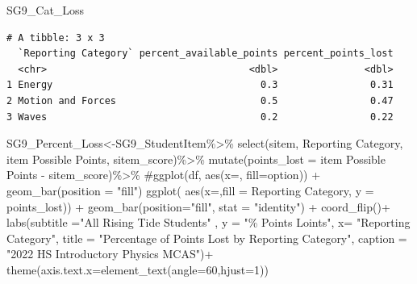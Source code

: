 \documentclass[
  letterpaper,
  DIV=11,
  numbers=noendperiod]{scrartcl}
\newenvironment{Shaded}{\begin{snugshade}}{\end{snugshade}}
\newcommand{\AttributeTok}[1]{\textcolor[rgb]{0.40,0.45,0.13}{#1}}
\newcommand{\CommentTok}[1]{\textcolor[rgb]{0.37,0.37,0.37}{#1}}
\newcommand{\DecValTok}[1]{\textcolor[rgb]{0.68,0.00,0.00}{#1}}
\newcommand{\FunctionTok}[1]{\textcolor[rgb]{0.28,0.35,0.67}{#1}}
\newcommand{\NormalTok}[1]{\textcolor[rgb]{0.00,0.23,0.31}{#1}}
\newcommand{\OtherTok}[1]{\textcolor[rgb]{0.00,0.23,0.31}{#1}}
\newcommand{\SpecialCharTok}[1]{\textcolor[rgb]{0.37,0.37,0.37}{#1}}
\newcommand{\StringTok}[1]{\textcolor[rgb]{0.13,0.47,0.30}{#1}}
\begin{document}
\begin{Shaded}
\begin{Highlighting}[]
\NormalTok{SG9\_Cat\_Loss}
\end{Highlighting}
\end{Shaded}

\begin{verbatim}
# A tibble: 3 x 3
  `Reporting Category` percent_available_points percent_points_lost
  <chr>                                   <dbl>               <dbl>
1 Energy                                    0.3                0.31
2 Motion and Forces                         0.5                0.47
3 Waves                                     0.2                0.22
\end{verbatim}

\begin{Shaded}
\begin{Highlighting}[]
\NormalTok{SG9\_Percent\_Loss}\OtherTok{\textless{}{-}}\NormalTok{SG9\_StudentItem}\SpecialCharTok{\%\textgreater{}\%}
  \FunctionTok{select}\NormalTok{(}\StringTok{\textasciigrave{}}\AttributeTok{sitem}\StringTok{\textasciigrave{}}\NormalTok{, }\StringTok{\textasciigrave{}}\AttributeTok{Reporting Category}\StringTok{\textasciigrave{}}\NormalTok{, }\StringTok{\textasciigrave{}}\AttributeTok{item Possible Points}\StringTok{\textasciigrave{}}\NormalTok{, }\StringTok{\textasciigrave{}}\AttributeTok{sitem\_score}\StringTok{\textasciigrave{}}\NormalTok{)}\SpecialCharTok{\%\textgreater{}\%}
  \FunctionTok{mutate}\NormalTok{(}\StringTok{\textasciigrave{}}\AttributeTok{points\_lost}\StringTok{\textasciigrave{}} \OtherTok{=} \StringTok{\textasciigrave{}}\AttributeTok{item Possible Points}\StringTok{\textasciigrave{}} \SpecialCharTok{{-}} \StringTok{\textasciigrave{}}\AttributeTok{sitem\_score}\StringTok{\textasciigrave{}}\NormalTok{)}\SpecialCharTok{\%\textgreater{}\%}
  \CommentTok{\#ggplot(df, aes(x=\textquotesingle{}\textquotesingle{}, fill=option)) + geom\_bar(position = "fill") }
  \FunctionTok{ggplot}\NormalTok{( }\FunctionTok{aes}\NormalTok{(}\AttributeTok{x=}\StringTok{\textquotesingle{}\textquotesingle{}}\NormalTok{,}\AttributeTok{fill =} \StringTok{\textasciigrave{}}\AttributeTok{Reporting Category}\StringTok{\textasciigrave{}}\NormalTok{, }\AttributeTok{y =} \StringTok{\textasciigrave{}}\AttributeTok{points\_lost}\StringTok{\textasciigrave{}}\NormalTok{)) }\SpecialCharTok{+}
    \FunctionTok{geom\_bar}\NormalTok{(}\AttributeTok{position=}\StringTok{"fill"}\NormalTok{, }\AttributeTok{stat =} \StringTok{"identity"}\NormalTok{) }\SpecialCharTok{+} \FunctionTok{coord\_flip}\NormalTok{()}\SpecialCharTok{+}
 \FunctionTok{labs}\NormalTok{(}\AttributeTok{subtitle =}\StringTok{"All Rising Tide Students"}\NormalTok{ ,}
       \AttributeTok{y =} \StringTok{"\% Points Loints"}\NormalTok{,}
       \AttributeTok{x=} \StringTok{"Reporting Category"}\NormalTok{,}
       \AttributeTok{title =} \StringTok{"Percentage of Points Lost by Reporting Category"}\NormalTok{,}
      \AttributeTok{caption =} \StringTok{"2022 HS Introductory Physics MCAS"}\NormalTok{)}\SpecialCharTok{+}
       \FunctionTok{theme}\NormalTok{(}\AttributeTok{axis.text.x=}\FunctionTok{element\_text}\NormalTok{(}\AttributeTok{angle=}\DecValTok{60}\NormalTok{,}\AttributeTok{hjust=}\DecValTok{1}\NormalTok{))}
   


\end{Highlighting}
\end{Shaded}
\end{document}
